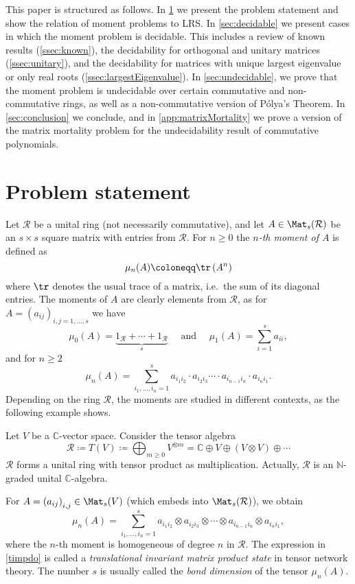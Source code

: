\renewcommand{\arraystretch}{1}

This paper is structured as follows. In \cref{sec:problem} we present the problem statement and show the relation of moment problems to LRS. In \cref{sec:decidable} we present cases in which the moment problem is decidable. This includes a review of known results (\cref{ssec:known}), the decidability for orthogonal and unitary matrices (\cref{ssec:unitary}), and the decidability for matrices with unique largest eigenvalue or only real roots (\cref{ssec:largestEigenvalue}). In \cref{sec:undecidable}, we prove that the moment problem is undecidable over certain commutative and non-commutative rings, as well as a non-commutative version of P\'olya's Theorem. In \cref{sec:conclusion} we conclude, and in \cref{app:matrixMortality} we prove a version of the matrix mortality problem for the undecidability result of commutative polynomials.


\section{Problem statement}
\label{sec:problem}

Let  $\mathcal R$ be a unital ring (not necessarily commutative), and let
 $A\in \Mat_s(\mathcal R)$ be an $s\times s$ square matrix with entries from  $\mathcal R.$  For $n\geqslant 0$  the \emph{$n$-th moment of $A$} is defined as $$\mu_n(A) \coloneqq \tr\left(A^n\right)$$  where $\tr$ denotes the usual trace of a matrix, i.e.\ the sum of its diagonal entries.
The moments of $A$ are clearly elements from  $\mathcal R$, as for $A=\left(a_{ij}\right)_{i,j=1,\ldots, s}$ we have $$\mu_0(A)=\underbrace{1_{\mathcal R}+\cdots + 1_{\mathcal R}}_s \quad \mbox{ and }\quad  \mu_1(A)=\sum_{i=1}^s a_{ii},$$
and for $n\geqslant 2$
$$\mu_n(A)=\sum_{i_1,\ldots, i_n=1}^s a_{i_1i_2}\cdot a_{i_2i_3}\cdots \cdot a_{i_{n-1}i_n}\cdot a_{i_n i_1}.$$
Depending on the ring $\mathcal{R}$, the moments are studied in different contexts, as the following example shows.

\begin{example}
\label{ex:MPO_moment}
Let $V$ be a $\mathbb{C}$-vector space. Consider the tensor algebra $$\mathcal R \coloneqq T(V) \coloneqq \bigoplus_{m\geqslant 0} V^{\otimes m}= \mathbb{C} \oplus V \oplus \left( V\otimes V\right) \oplus \cdots $$
$\mathcal R$ forms a  unital ring with  tensor product as  multiplication.
Actually,  $\mathcal R$ is an $\mathbb N$-graded unital $\mathbb{C}$-algebra.

For  $A=\left(a_{ij}\right)_{i,j}\in \Mat_s(V)$ (which embeds into $\Mat_s(\mathcal R)$), we obtain
\begin{equation}\label{timpdo}
\mu_n(A)=\sum_{i_1,\ldots, i_n=1}^s a_{i_1i_2}\otimes a_{i_2i_3}\otimes  \cdots \otimes a_{i_{n-1}i_n}\otimes a_{i_n i_1},\end{equation} 
where the $n$-th moment is homogeneous of degree $n$ in $\mathcal R$. 
The expression in \eqref{timpdo} is called a \emph{translational invariant matrix product state} in tensor network theory. The number $s$ is usually called the  \emph{bond dimension} of the tensor $\mu_n(A)$.
\demo\end{example}


